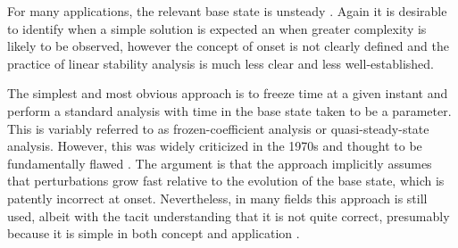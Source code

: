 \documentclass[letterpaper,prl,aps,twocolumn,reprint,superscriptaddress]{revtex4-1}
\begin{document}
For many applications, the relevant base state is unsteady \cite{brouillette2002richtmyer,anderson2010foam,homsy1987viscous,thorpe1968method,MORE}.  Again it is desirable to identify when a simple solution is expected an when greater complexity is likely to be observed, however the concept of onset is not clearly defined and the practice of linear stability analysis is much less clear and less well-established.  

The simplest and most obvious approach is to freeze time at a given instant and perform a standard analysis with time in the base state taken to be a parameter.  This is variably referred to as frozen-coefficient analysis or quasi-steady-state analysis.  However, this was widely criticized in the 1970s and thought to be fundamentally flawed \cite{GreshoSani71,Homsy}.  The argument is that the approach implicitly assumes that perturbations grow fast relative to the evolution of the base state, which is patently incorrect at onset.  Nevertheless, in many fields this approach is still used, albeit with the tacit understanding that it is not quite correct, presumably because it is simple in both concept and application \cite{Meiburg,BertozziBrenner}.
\end{document}
